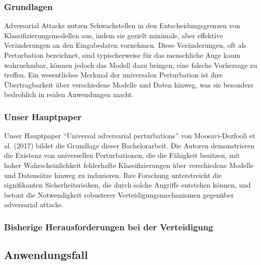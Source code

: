 \subsubsection{Grundlagen}

Adversarial Attacks nutzen Schwachstellen in den Entscheidungsgrenzen von Klassifizierungsmodellen aus, indem sie gezielt minimale, aber effektive Veränderungen an den Eingabedaten vornehmen. Diese Veränderungen, oft als Perturbation bezeichnet, sind typischerweise für das menschliche Auge kaum wahrnehmbar, können jedoch das Modell dazu bringen, eine falsche Vorhersage zu treffen. Ein wesentliches Merkmal der universalen Perturbation ist ihre Übertragbarkeit über verschiedene Modelle und Daten hinweg, was sie besonders bedrohlich in realen Anwendungen macht.

\subsubsection{Unser Hauptpaper}

Unser Hauptpaper ``Universal adversarial perturbations'' von Moosavi-Dezfooli et al. (2017) \cite{moosavi-dezfooli_universal_2017} bildet die Grundlage dieser Bachelorarbeit. Die Autoren demonstrieren die Existenz von universellen Perturbationen, die die Fähigkeit besitzen, mit hoher Wahrscheinlichkeit fehlerhafte Klassifizierungen über verschiedene Modelle und Datensätze hinweg zu induzieren. Ihre Forschung unterstreicht die signifikanten Sicherheitsrisiken, die durch solche Angriffe entstehen können, und betont die Notwendigkeit robusterer Verteidigungsmechanismen gegenüber adversarial attacks.

\subsubsection{Bisherige Herausforderungen bei der Verteidigung}


\subsection{Anwendungsfall}

